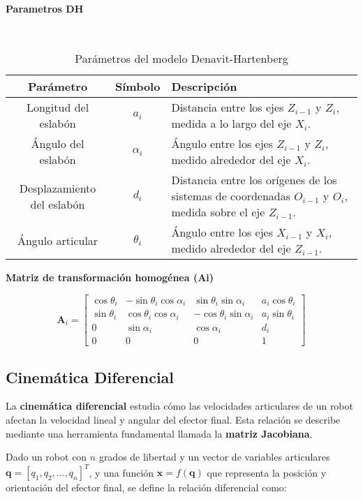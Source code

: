 \textbf{Parametros DH}
\begin{table}[H]\
	\centering
	\begin{tabular}{|c|c|p{9cm}|}
		\hline
		\textbf{Parámetro} & \textbf{Símbolo} & \textbf{Descripción} \\
		\hline
		Longitud del eslabón & $a_i$ & Distancia entre los ejes $Z_{i-1}$ y $Z_i$, medida a lo largo del eje $X_i$. \\
		\hline
		Ángulo del eslabón & $\alpha_i$ & Ángulo entre los ejes $Z_{i-1}$ y $Z_i$, medido alrededor del eje $X_i$. \\
		\hline
		Desplazamiento del eslabón & $d_i$ & Distancia entre los orígenes de los sistemas de coordenadas $O_{i-1}$ y $O_i$, medida sobre el eje $Z_{i-1}$. \\
		\hline
		Ángulo articular & $\theta_i$ & Ángulo entre los ejes $X_{i-1}$ y $X_i$, medido alrededor del eje $Z_{i-1}$. \\
		\hline
	\end{tabular}
	\caption{Parámetros del modelo Denavit-Hartenberg}
	\label{tabla:dh}
\end{table}


\textbf{Matriz de transformación homogénea (Ai)}


\[
\mathbf{A}_i =
\begin{bmatrix}
	\cos\theta_i & -\sin\theta_i\cos\alpha_i & \sin\theta_i\sin\alpha_i & a_i\cos\theta_i \\
	\sin\theta_i & \cos\theta_i\cos\alpha_i & -\cos\theta_i\sin\alpha_i & a_i\sin\theta_i \\
	0            & \sin\alpha_i              & \cos\alpha_i              & d_i \\
	0            & 0                         & 0                         & 1
\end{bmatrix}
\]



\subsection{Cinemática Diferencial}

La \textbf{cinemática diferencial} estudia cómo las velocidades articulares de un robot afectan la velocidad lineal y angular del efector final. Esta relación se describe mediante una herramienta fundamental llamada la \textbf{matriz Jacobiana}.

Dado un robot con $n$ grados de libertad y un vector de variables articulares $\boldsymbol{q} = [q_1, q_2, \dots, q_n]^T$, y una función $\boldsymbol{x} = f(\boldsymbol{q})$ que representa la posición y orientación del efector final, se define la relación diferencial como:


